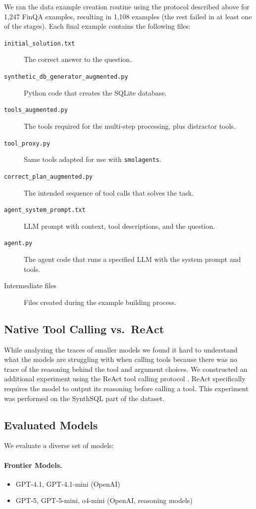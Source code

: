 \documentclass[11pt]{article}
\newcommand{\synthsubset}{SynthSQL\xspace}
\begin{document}
We ran the data example creation routine using the protocol described above for 1,247 FinQA examples, resulting in 1,108 examples (the rest failed in at least one of the stages). Each final example contains the following files:
\begin{description}
    \item[\texttt{initial\_solution.txt}] The correct answer to the question.
    \item[\texttt{synthetic\_db\_generator\_augmented.py}] Python code that creates the SQLite database.
    \item[\texttt{tools\_augmented.py}] The tools required for the multi-step processing, plus distractor tools.
    \item[\texttt{tool\_proxy.py}] Same tools adapted for use with \texttt{smolagents}.
    \item[\texttt{correct\_plan\_augmented.py}] The intended sequence of tool calls that solves the task.
    \item[\texttt{agent\_system\_prompt.txt}] LLM prompt with context, tool descriptions, and the question.
    \item[\texttt{agent.py}] The agent code that runs a specified LLM with the system prompt and tools.
    \item[Intermediate files] Files created during the example building process.
\end{description}

\subsection{Native Tool Calling vs.\ ReAct}

While analyzing the traces of smaller models we found it hard to understand what the models are struggling with when calling tools because there was no trace of the reasoning behind the tool and argument choices. We constructed an additional experiment using the ReAct tool calling protocol \citep{yao2022react}. ReAct specifically requires the model to output its reasoning before calling a tool. This experiment was performed on the \synthsubset part of the dataset.

\subsection{Evaluated Models}

We evaluate a diverse set of models:

\paragraph{Frontier Models.}
\begin{itemize}
    \item GPT-4.1, GPT-4.1-mini (OpenAI)
    \item GPT-5, GPT-5-mini, o4-mini (OpenAI, reasoning models)
\end{itemize}
\end{document}
